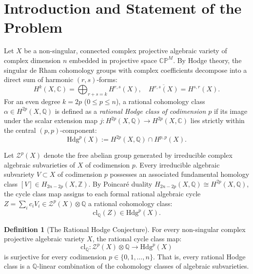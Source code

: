 \documentclass[11pt,reqno]{article}
\theoremstyle{definition}
\newtheorem{definition}[theorem]{Definition}
\begin{document}
\tableofcontents

\newpage

\section{Introduction and Statement of the Problem}

Let $X$ be a non-singular, connected complex projective algebraic variety of complex dimension $n$ embedded in projective space $\mathbb{CP}^M$. By Hodge theory, the singular de Rham cohomology groups with complex coefficients decompose into a direct sum of harmonic $(r,s)$-forms:
\begin{equation}
H^k(X, \mathbb{C}) = \bigoplus_{r+s=k} H^{r,s}(X), \quad \overline{H^{r,s}(X)} = H^{s,r}(X).
\end{equation}
For an even degree $k = 2p$ ($0 \le p \le n$), a rational cohomology class $\alpha \in H^{2p}(X, \mathbb{Q})$ is defined as a \emph{rational Hodge class of codimension $p$} if its image under the scalar extension map $j : H^{2p}(X, \mathbb{Q}) \to H^{2p}(X, \mathbb{C})$ lies strictly within the central $(p,p)$-component:
\begin{equation}
\mathrm{Hdg}^p(X) := H^{2p}(X, \mathbb{Q}) \cap H^{p,p}(X).
\end{equation}

Let $\mathcal{Z}^p(X)$ denote the free abelian group generated by irreducible complex algebraic subvarieties of $X$ of codimension $p$. Every irreducible algebraic subvariety $V \subset X$ of codimension $p$ possesses an associated fundamental homology class $[V] \in H_{2n-2p}(X, \mathbb{Z})$. By Poincaré duality $H_{2n-2p}(X, \mathbb{Q}) \cong H^{2p}(X, \mathbb{Q})$, the cycle class map assigns to each formal rational algebraic cycle $Z = \sum_i c_i V_i \in \mathcal{Z}^p(X) \otimes \mathbb{Q}$ a rational cohomology class:
\begin{equation}
\mathrm{cl}_\mathbb{Q}(Z) \in \mathrm{Hdg}^p(X).
\end{equation}

\begin{definition}[The Rational Hodge Conjecture]
For every non-singular complex projective algebraic variety $X$, the rational cycle class map:
\begin{equation}
\mathrm{cl}_\mathbb{Q} : \mathcal{Z}^p(X) \otimes \mathbb{Q} \longrightarrow \mathrm{Hdg}^p(X)
\end{equation}
is surjective for every codimension $p \in \{0, 1, \dots, n\}$. That is, every rational Hodge class is a $\mathbb{Q}$-linear combination of the cohomology classes of algebraic subvarieties.
\end{definition}
\end{document}
